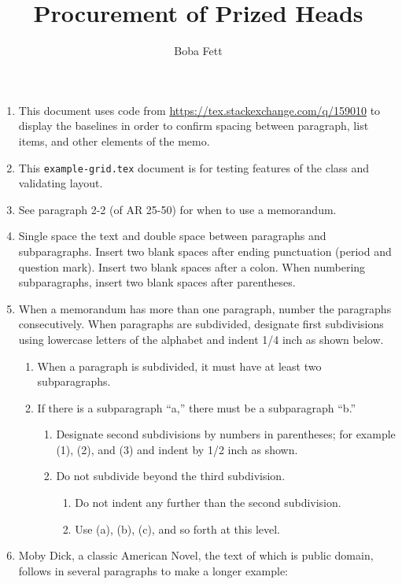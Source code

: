\documentclass{../armymemo}
\author{Boba Fett}
\title{Procurement of Prized Heads}
\begin{document}
\begin{enumerate}
\item This document uses code from \url{https://tex.stackexchange.com/q/159010}
  to display the baselines in order to confirm spacing between paragraph, list
  items, and other elements of the memo.
\item This \verb!example-grid.tex! document is for testing features of the class
  and validating layout.
\item See paragraph 2-2 (of AR 25-50) for when to use a memorandum.
\item Single space the text and double space between paragraphs and
  subparagraphs. Insert two blank spaces after ending punctuation (period and
  question mark). Insert two blank spaces after a colon. When numbering
  subparagraphs, insert two blank spaces after parentheses.
\item When a memorandum has more than one paragraph, number the paragraphs
  consecutively. When paragraphs are subdivided, designate first subdivisions
  using lowercase letters of the alphabet and indent 1/4 inch as shown below.
  \begin{enumerate}
  \item When a paragraph is subdivided, it must have at least two subparagraphs.
  \item If there is a subparagraph ``a,'' there must be a subparagraph ``b.''
    \begin{enumerate}
    \item Designate second subdivisions by numbers in parentheses; for example
      (1), (2), and (3) and indent by 1/2 inch as shown.
    \item Do not subdivide beyond the third subdivision.
      \begin{enumerate}
      \item Do not indent any further than the second subdivision.
      \item Use (a), (b), (c), and so forth at this level.
      \end{enumerate}
    \end{enumerate}
  \end{enumerate}
\item Moby Dick, a classic American Novel, the text of which is public domain,
  follows in several paragraphs to make a longer example:
  \begin{enumerate}

\end{enumerate}
\end{enumerate}
\end{document}
